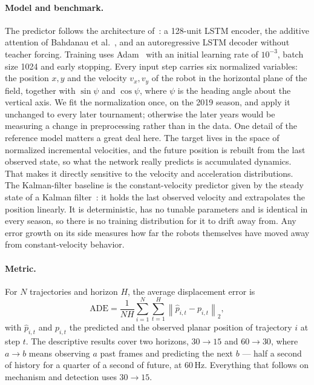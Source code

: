 \documentclass[runningheads]{llncs}
\begin{document}
\paragraph{Model and benchmark.}
The predictor follows the architecture of~\cite{seq2seq}: a 128-unit LSTM
encoder, the additive attention of Bahdanau et al.~\cite{bahdanau}, and an
autoregressive LSTM decoder without teacher forcing. Training uses
Adam~\cite{adam} with an initial learning rate of $10^{-3}$, batch size 1024
and early stopping. Every input step carries six normalized variables: the
position $x,y$ and the velocity $v_x,v_y$ of the robot in the horizontal plane
of the field, together with $\sin\psi$ and $\cos\psi$, where $\psi$ is the
heading angle about the vertical axis. We fit the normalization once, on the
2019 season, and apply it unchanged to every later tournament; otherwise the
later years would be measuring a change in preprocessing rather than in the
data. One detail of the reference model matters a great deal here. The target
lives in the space of normalized incremental velocities, and the future
position is rebuilt from the last observed state, so what the network really
predicts is accumulated dynamics. That makes it directly sensitive to the
velocity and acceleration distributions. The Kalman-filter baseline is the
constant-velocity predictor given by the steady state of a Kalman
filter~\cite{kalman}: it holds the last observed velocity and extrapolates the
position linearly. It is deterministic, has no tunable parameters and is
identical in every season, so there is no training distribution for it to drift
away from. Any error growth on its side measures how far the robots themselves
have moved away from constant-velocity behavior.

\paragraph{Metric.}
For $N$ trajectories and horizon $H$, the average displacement error is
\begin{equation}\label{eq:ade}
\mathrm{ADE} = \frac{1}{NH} \sum_{i=1}^{N}\sum_{t=1}^{H}
\left\lVert \hat{p}_{i,t} - p_{i,t} \right\rVert_2 ,
\end{equation}
with $\hat{p}_{i,t}$ and $p_{i,t}$ the predicted and the observed planar
position of trajectory $i$ at step $t$. The descriptive results cover two
horizons, $30 \rightarrow 15$ and $60 \rightarrow 30$, where $a \rightarrow b$
means observing $a$ past frames and predicting the next $b$ --- half a second
of history for a quarter of a second of future, at 60\,Hz. Everything that
follows on mechanism and detection uses $30 \rightarrow 15$.
\end{document}
